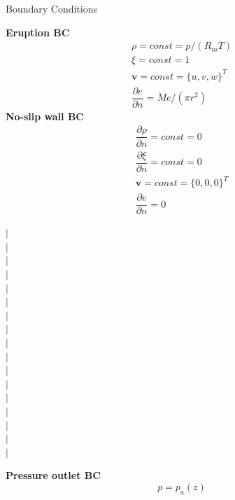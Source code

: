 \documentclass{beamer}
\begin{document}
\begin{frame}{Boundary Conditions}
\noindent
\begin{minipage}{.41\textwidth}
\textbf{Eruption BC}
\begin{align}
\rho =const = p/\left(R_m T\right) \label{eq:erupt_bc_rho} \\
\xi=const=1 \label{eq:erupt_bc_xi}\\
\textbf{v} = const =\{u,v,w\}^T \label{eq:erupt_bc_v}\\
\dfrac{\partial e}{\partial n}=\dot M e /\left(\pi r^2\right) \label{eq:erupt_bc_e}
\end{align} 
\textbf{No-slip wall BC}
\begin{align}
\dfrac{\partial \rho}{\partial n} = const = 0\label{eq:wall_bc_rho} \\
\dfrac{\partial \xi}{\partial n} = const = 0 \label{eq:wall_bc_xi}\\ 
\textbf{v} = const =\{0,0,0\}^T \label{eq:wall_bc_v}\\
\dfrac{\partial e }{\partial n} = 0\label{eq:wall_bc_e}
\end{align} 
\end{minipage} %
%
\begin{minipage}{.01\textwidth}
$\vert$\\
$\vert$\\
$\vert$\\
$\vert$\\
$\vert$\\
$\vert$\\
$\vert$\\
$\vert$\\
$\vert$\\
$\vert$\\
$\vert$\\
$\vert$\\
$\vert$\\
$\vert$\\
$\vert$\\
$\vert$\\
$\vert$\\
\end{minipage}
\begin{minipage}{.560\textwidth}
\begin{minipage}[!t]{\textwidth}
\textbf{Pressure outlet BC}
\begin{equation}
p = p_a\left(z\right)\label{eq:pressure_bc_p} 
\end{equation} 
\end{minipage}

\end{minipage}
\end{frame}
\end{document}
